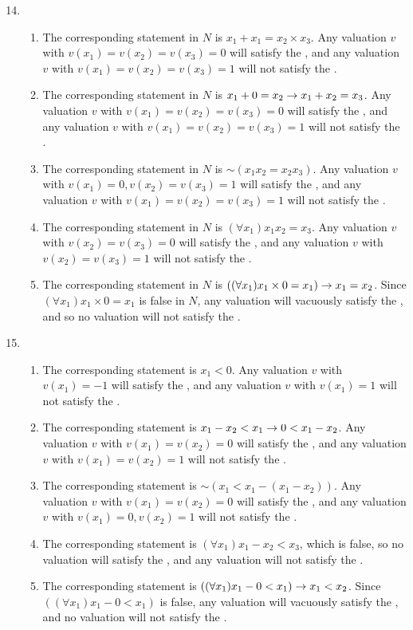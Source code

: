 \begin{enumerate}
  \setcounter{enumi}{13}

  \item %
    \begin{enumerate}
      \item The corresponding statement in \(N\) is \(x_1 + x_1 = x_2 \times x_3\). Any valuation \(v\) with \(v(x_1) = v(x_2) = v(x_3) = 0\) will satisfy the \wf{}, and any valuation \(v\) with \(v(x_1) = v(x_2) = v(x_3) = 1\) will not satisfy the \wf{}.
      \item The corresponding statement in \(N\) is \(x_1 + 0 = x_2 \rightarrow x_1 + x_2 = x_3\). Any valuation \(v\) with \(v(x_1) = v(x_2) = v(x_3) = 0\) will satisfy the \wf{}, and any valuation \(v\) with \(v(x_1) = v(x_2) = v(x_3) = 1\) will not satisfy the \wf{}.
      \item The corresponding statement in \(N\) is \(\sim(x_1x_2 = x_2x_3)\). Any valuation \(v\) with \(v(x_1) = 0, v(x_2) = v(x_3) = 1\) will satisfy the \wf{}, and any valuation \(v\) with \(v(x_1) = v(x_2) = v(x_3) = 1\) will not satisfy the \wf{}.
      \item The corresponding statement in \(N\) is \((\forall x_1) x_1x_2 = x_3\). Any valuation \(v\) with \(v(x_2) = v(x_3) = 0\) will satisfy the \wf{}, and any valuation \(v\) with \(v(x_2) = v(x_3) = 1\) will not satisfy the \wf{}.
      \item The corresponding statement in \(N\) is \(((\forall x_1) x_1 \times 0 = x_1) \rightarrow x_1 = x_2\). Since \((\forall x_1) x_1 \times 0 = x_1\) is false in \(N\), any valuation will vacuously satisfy the \wf{}, and so no valuation will not satisfy the \wf{}.
    \end{enumerate}

  \item %
    \begin{enumerate}
      \item The corresponding statement is \(x_1 < 0\). Any valuation \(v\) with \(v(x_1) = -1\) will satisfy the \wf{}, and any valuation \(v\) with \(v(x_1) = 1\) will not satisfy the \wf{}.
      \item The corresponding statement is \(x_1 - x_2 < x_1 \rightarrow 0 < x_1 - x_2\). Any valuation \(v\) with \(v(x_1) = v(x_2) = 0\) will satisfy the \wf{}, and any valuation \(v\) with \(v(x_1) = v(x_2) = 1\) will not satisfy the \wf{}.
      \item The corresponding statement is \(\sim(x_1 < x_1 - (x_1 - x_2))\). Any valuation \(v\) with \(v(x_1) = v(x_2) = 0\) will satisfy the \wf{}, and any valuation \(v\) with \(v(x_1) = 0, v(x_2) = 1\) will not satisfy the \wf{}.
      \item The corresponding statement is \((\forall x_1) x_1 - x_2 < x_3\), which is false, so no valuation will satisfy the \wf{}, and any valuation will not satisfy the \wf{}.
      \item The corresponding statement is \(((\forall x_1) x_1 - 0 < x_1) \rightarrow x_1 < x_2\). Since \(((\forall x_1) x_1 - 0 < x_1)\) is false, any valuation will vacuously satisfy the \wf{}, and no valuation will not satisfy the \wf{}.
    \end{enumerate}


\end{enumerate}
